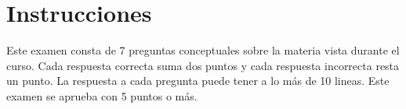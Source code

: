 
\section*{Instrucciones}

Este examen consta de 7 preguntas conceptuales sobre la materia vista durante el curso. Cada respuesta correcta suma dos puntos y cada respuesta incorrecta resta un punto. La respuesta a cada pregunta puede tener a lo más de 10 lineas. 
Este examen se aprueba con 5 puntos o más.
